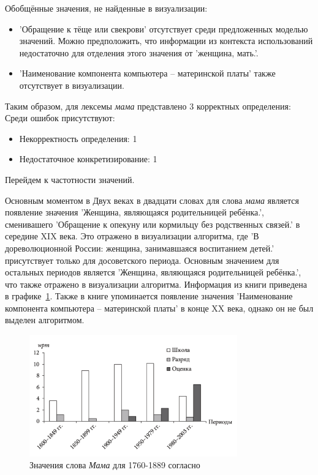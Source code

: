 Обобщённые значения, не найденные в визуализации:
\begin{itemize}
    \item ’Обращение к тёще или свекрови’ отсутствует среди предложенных моделью значений.
Можно предположить, что информации из контекста использований недостаточно для отделения
этого значения от ’женщина, мать.’.

    \item ’Наименование компонента компьютера – материнской платы’ также отсутствует в визуализации.
\end{itemize}

Таким образом, для лексемы \textit{мама} представлено 3 корректных определения:
Среди ошибок присутствуют:
\begin{itemize}
    \item Некорректность определения: 1
    \item Недостаточное конкретизирование: 1
\end{itemize}

Перейдем к частотности значений.

Основным моментом в Двух веках в двадцати словах для слова \textit{мама}
является появление значения ’Женщина, являющаяся родительницей ребёнка.’, сменивашего
’Обращение к опекуну или кормильцу без родственных связей.’ в середине XIX века.
Это отражено в визуализации алгоритма, где ’В дореволюционной России: женщина, занимавшаяся воспитанием детей.’
присутствует только для досоветского периода.
Основным значением для остальных периодов является ’Женщина, являющаяся родительницей ребёнка.’,
что также отражено в визуализации алгоритма.
Информация из книги приведена в графике~\ref{fig:TwoCenturiesMom}.
Также в книге упоминается появление значения ’Наименование компонента компьютера – материнской платы’
в конце XX века, однако он не был выделен алгоритмом.

\begin{figure}[H]
    \centering %
    \includegraphics[width=0.8\textwidth]{img/book/klassnij/all}
    \caption{Значения слова \textit{Мама} для 1760-1889 согласно~\cite{TwoCenturies}}
    \label{fig:TwoCenturiesMom}
\end{figure}


